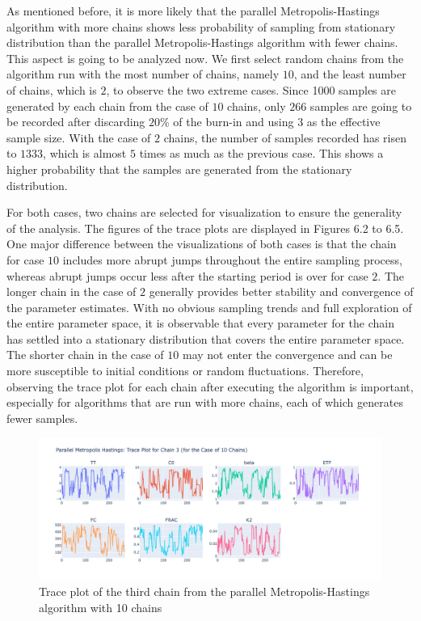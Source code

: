 As mentioned before, it is more likely that the parallel Metropolis-Hastings algorithm with more chains shows less probability of sampling from stationary distribution than the parallel Metropolis-Hastings algorithm with fewer chains. This aspect is going to be analyzed now. We first select random chains from the algorithm run with the most number of chains, namely $10$, and the least number of chains, which is $2$, to observe the two extreme cases. Since 1000 samples are generated by each chain from the case of $10$ chains, only $266$ samples are going to be recorded after discarding $20\%$ of the burn-in and using $3$ as the effective sample size. With the case of $2$ chains, the number of samples recorded has risen to $1333$, which is almost $5$ times as much as the previous case. This shows a higher probability that the samples are generated from the stationary distribution.

For both cases, two chains are selected for visualization to ensure the generality of the analysis. The figures of the trace plots are displayed in Figures 6.2 to 6.5. One major difference between the visualizations of both cases is that the chain for case $10$ includes more abrupt jumps throughout the entire sampling process, whereas abrupt jumps occur less after the starting period is over for case $2$. The longer chain in the case of $2$ generally provides better stability and convergence of the parameter estimates. With no obvious sampling trends and full exploration of the entire parameter space, it is observable that every parameter for the chain has settled into a stationary distribution that covers the entire parameter space. The shorter chain in the case of $10$ may not enter the convergence and can be more susceptible to initial conditions or random fluctuations. Therefore, observing the trace plot for each chain after executing the algorithm is important, especially for algorithms that are run with more chains, each of which generates fewer samples.

\begin{figure}[H]
    \centering
    \includegraphics[width=1\textwidth]{figures/parallel_mh/tp_rand_10_3.png}
    \captionsetup{width=.8\textwidth}
    \caption{Trace plot of the third chain from the parallel Metropolis-Hastings algorithm with 10 chains}
    \label{fig:enter-label}
\end{figure}

